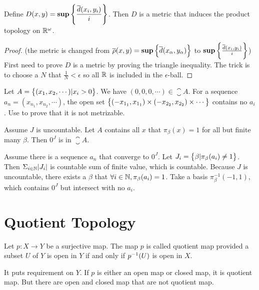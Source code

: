 \begin{theorem}
    Define $\displaystyle D(x,y) = \mathbf{sup} \set{\frac{\overline{d}(x_i, y_i )}{i}} $. Then $D$ is a metric that induces the product topology on $\mathbb{R}^\omega$.
\end{theorem}
\begin{proof}
    (the metric is changed from $\overline{\rho}(x,y) = \mathbf{sup} \set{ \overline{d}(x_{\alpha}, y_{\alpha})} $ to $\mathbf{sup} \set{\frac{\overline{d}(x_i, y_i )}{i}} $) First need to prove $D$ is a metric by proving the triangle inequality. The trick is to choose a $N$ that $\frac{1}{N} < \epsilon$ so all $\mathbb{R}$ is included in the $\epsilon$-ball.
\end{proof}


\begin{example}
    Let $A = \set{(x_1, x_2, \cdots ) | x_i > 0}$. We have $(0,0,0, \cdots) \in \closure{A}$. For a sequence $a_n = (x_{n_1}, x_{n_2}, \cdots)$, the open set $\set{(- x_{1_1}, x_{1_1}) \times (- x_{2_2}, x_{2_2}) \times \cdots}$ contains no $a_i$. Use  to prove that it is not metrizable.
\end{example}


\begin{example}
    Assume $J$ is uncountable. Let $A$ contains all $x$ that $\pi_{\beta}(x) = 1$ for all but finite many $\beta$. Then $0^J$ is in $\closure{A}$.
    
    Assume there is a sequence $a_n$ that converge to $0^J$. Let $J_i = \set{\beta | \pi_\beta (a_i) \neq 1 }$. Then $\Sigma_{i\in \mathbb{N}} \abs{J_i}$ is countable sum of finite value, which is countable. Because $J$ is uncountable, there exists a $\beta$ that $\forall i \in \mathbb{N}, \pi_\beta (a_i) = 1$. Take a basis $\pi_{\beta}^{-1}(-1,1)$, which contains $0^J$ but intersect with no $a_i$.
\end{example}


\section{Quotient Topology}

\begin{definition}
    Let $p: X \rightarrow Y$ be a surjective map. The map $p$ is called quotient map provided a subset $U$ of $Y$ is open in $Y$ if and only if ${p}^{-1}(U)$ is open in $X$.
    
    It puts requirement on $Y$. If $p$ is either an open map or closed map, it is quotient map. But there are open and closed map that are not quotient map.
\end{definition}

